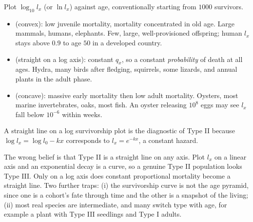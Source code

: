 \begin{thmbox}[title={PRINCIPLE: the three survivorship curves}]
Plot $\log_{10} l_x$ (or $\ln l_x$) against age, conventionally starting from
$1000$ survivors.
\begin{itemize}
\item {} (convex): low juvenile mortality, mortality concentrated in old
age. Large mammals, humans, elephants. Few, large, well-provisioned offspring;
human $l_x$ stays above $0.9$ to age $50$ in a developed country.
\item {} (straight on a log axis): constant $q_x$, so a constant
\emph{probability} of death at all ages. Hydra, many birds after fledging,
squirrels, some lizards, and annual plants in the adult phase.
\item {} (concave): massive early mortality then low adult mortality.
Oysters, most marine invertebrates, oaks, most fish. An oyster releasing
$10^{8}$ eggs may see $l_x$ fall below $10^{-6}$ within weeks.
\end{itemize}
A straight line on a log survivorship plot is the diagnostic of Type II because
$\log l_x=\log l_0 - kx$ corresponds to $l_x=e^{-kx}$, a constant hazard.
\end{thmbox}

\begin{warnbox}[title={TRAP: survivorship curves need a logarithmic axis}]
The wrong belief is that Type II is a straight line on any axis. Plot $l_x$ on a
linear axis and an exponential decay is a curve, so a genuine Type II population
looks Type III. Only on a log axis does constant proportional mortality become a
straight line. Two further traps: (i) the survivorship curve is not the age
pyramid, since one is a cohort's fate through time and the other is a snapshot of
the living; (ii) most real species are intermediate, and many switch type with
age, for example a plant with Type III seedlings and Type I adults.
\end{warnbox}

